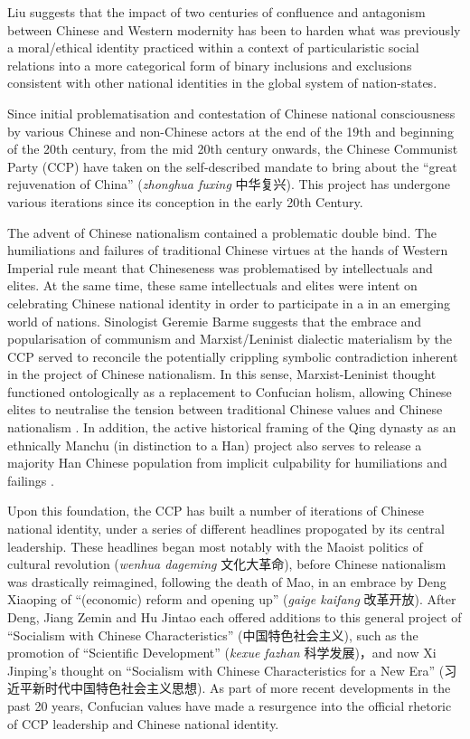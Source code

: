 \begin{CJK}{UTF8}{gbsn}
Liu suggests that the impact of two centuries of confluence and antagonism between Chinese and Western modernity has been to harden what was previously a moral/ethical identity practiced within a context of particularistic social relations into a more categorical form of binary inclusions and exclusions consistent with other national identities in the global system of nation-states.

Since initial problematisation and contestation of Chinese national consciousness by various Chinese and non-Chinese actors at the end of the 19th and beginning of the 20th century, from the mid 20th century onwards, the Chinese Communist Party (CCP) have taken on the self-described mandate to bring about the ``great rejuvenation of China'' (\textit{zhonghua fuxing} 中华复兴).  This project has undergone various iterations since its conception in the early 20th Century.

The advent of Chinese nationalism contained a problematic double bind.
The humiliations and failures of traditional Chinese virtues at the hands of Western Imperial rule meant that Chineseness was problematised by intellectuals and elites.  At the same time, these same intellectuals and elites were intent on celebrating Chinese national identity in order to participate in a in an emerging world of nations.  Sinologist Geremie Barme suggests that the embrace and popularisation of communism and Marxist/Leninist dialectic materialism by the CCP served to reconcile the potentially crippling symbolic contradiction inherent in the project of Chinese nationalism. In this sense, Marxist-Leninist thought functioned ontologically as a replacement to Confucian holism, allowing Chinese elites to neutralise the tension between traditional Chinese values and Chinese nationalism \citep{Barme2009}.  In addition, the active historical framing of the Qing dynasty as an ethnically Manchu (in distinction to a Han) project also serves to release a majority Han Chinese population from implicit culpability for humiliations and failings \citep{Barme2015a}.

Upon this foundation, the CCP has built a number of iterations of Chinese national identity, under a series of different headlines propogated by its central leadership. These headlines began most notably with the Maoist politics of cultural revolution (\textit{wenhua dageming} 文化大革命), before Chinese nationalism was drastically reimagined, following the death of Mao, in an embrace by Deng Xiaoping of ``(economic) reform and opening up'' (\textit{gaige kaifang} 改革开放).  After Deng, Jiang Zemin and Hu Jintao each offered additions to this general project of ``Socialism with Chinese Characteristics'' (中国特色社会主义), such as the promotion of ``Scientific Development'' (\textit{kexue fazhan} 科学发展)，and now Xi Jinping's thought on ``Socialism with Chinese Characteristics for a New Era'' (习近平新时代中国特色社会主义思想). As part of more recent developments in the past 20 years, Confucian values have made a resurgence into the official rhetoric of CCP leadership and Chinese national identity.



\end{CJK}

